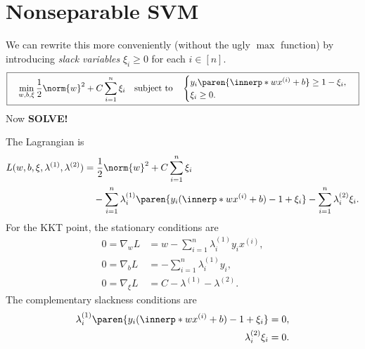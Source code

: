 \section{Nonseparable SVM} \label{sec:svm:nonsep}

We can rewrite this more conveniently (without the ugly $\max$ function)
by introducing \emph{slack variables} $\xi_i \ge 0$ for each $i \in [n]$.
\[
    \boxed{
        \quad\min_{w, b, \xi} \frac12 \norm{w}^2 + C\sum_{i=1}^n \xi_i
        \quad\text{subject to}\quad
        \begin{cases}
            y_i \paren{\innerp*{w}{x^{(i)}} + b} \ge 1 - \xi_i, \\
            \xi_i \ge 0.
        \end{cases}
    }
\]
Now \textbf{SOLVE!}

The Lagrangian is \begin{align*}
    L(w, b, \xi, \lambda^{(1)}, \lambda^{(2)})
        &= \frac12 \norm{w}^2 + C\sum_{i=1}^n \xi_i \\
        &\quad- \sum_{i=1}^n \lambda^{(1)}_i 
            \paren{y_i (\innerp*{w}{x^{(i)}} + b) - 1 + \xi_i}
        - \sum_{i=1}^n \lambda^{(2)}_i \xi_i.
\end{align*} For the KKT point, the stationary conditions are \begin{align}
    0 = \nabla_w L
        &= w - \sum_{i=1}^n \lambda^{(1)}_i y_i x^{(i)},
        \label{eq:nonsep:w} \\
    0 = \nabla_b L
        &= -\sum_{i=1}^n \lambda^{(1)}_i y_i,
        \label{eq:nonsep:b} \\
    0 = \nabla_{\xi} L
        &= C - \lambda^{(1)} - \lambda^{(2)}.
        \label{eq:nonsep:xi}
\end{align}
The complementary slackness conditions are \begin{align}
    \lambda^{(1)}_i \paren{y_i (\innerp*{w}{x^{(i)}} + b) - 1 + \xi_i}
        &= 0, \label{eq:nonsep:cs1} \\
    \lambda^{(2)}_i \xi_i
        &= 0. \label{eq:nonsep:cs2}
\end{align}
